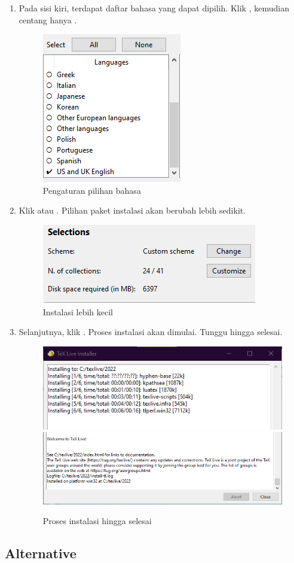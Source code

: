 \documentclass{book} %
\begin{document}
\begin{enumerate}
		\item Pada sisi kiri, terdapat daftar bahasa yang dapat dipilih.
		Klik , kemudian centang hanya .

		\begin{figure}[!ht]
			\centering
			\includegraphics[width=0.2\linewidth]{images/texlivewin6}
			\caption{Pengaturan pilihan bahasa}
		\end{figure}

		\item Klik  atau .
		Pilihan paket instalasi akan berubah lebih sedikit.

		\begin{figure}[!ht]
			\centering
			\includegraphics[width=0.3\linewidth]{images/texlivewin7}
			\caption{Instalasi lebih kecil}
		\end{figure}

		\item Selanjutnya, klik .
		Proses instalasi akan dimulai.
		Tunggu hingga selesai.

		\begin{figure}[!ht]
			\centering
			\includegraphics[width=0.4\linewidth]{images/texlivewin8}
			\includegraphics[width=0.4\linewidth]{images/texlivewin9}
			\caption{Proses instalasi hingga selesai}
		\end{figure}

	\end{enumerate}

	\newpage
	\subsection{Alternative}
\end{document}
